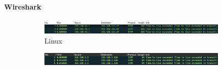 \paragraph{Wireshark}
\begin{figure}[!htb]
    \centering
    \begin{subfigure}{\textwidth}
        \includegraphics[width=\textwidth,height=.85\textwidth,keepaspectratio]{./img/linux_traceroute.png}
        \caption{Linux}
    \end{subfigure}
    \begin{subfigure}{\textwidth}
        \includegraphics[width=\textwidth,height=.85\textwidth,keepaspectratio]{./img/darwin_traceroute.png}

\end{subfigure}
\end{figure}
